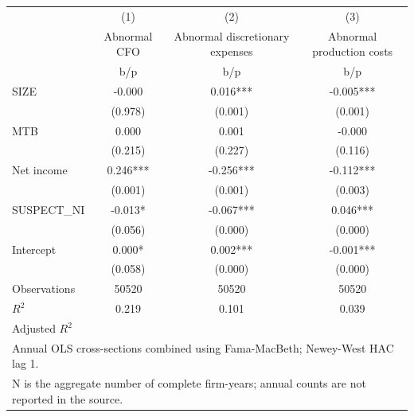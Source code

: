 {
\def\sym#1{\ifmmode^{#1}\else\(^{#1}\)\fi}
\begin{tabular}{l*{3}{c}}
\hline\hline
                    &\multicolumn{1}{c}{(1)}&\multicolumn{1}{c}{(2)}&\multicolumn{1}{c}{(3)}\\
                    &\multicolumn{1}{c}{Abnormal CFO}&\multicolumn{1}{c}{Abnormal discretionary expenses}&\multicolumn{1}{c}{Abnormal production costs}\\
                    &         b/p   &         b/p   &         b/p   \\
\hline
SIZE                &      -0.000   &       0.016***&      -0.005***\\
                    &     (0.978)   &     (0.001)   &     (0.001)   \\
MTB                 &       0.000   &       0.001   &      -0.000   \\
                    &     (0.215)   &     (0.227)   &     (0.116)   \\
Net income          &       0.246***&      -0.256***&      -0.112***\\
                    &     (0.001)   &     (0.001)   &     (0.003)   \\
SUSPECT\_NI          &      -0.013*  &      -0.067***&       0.046***\\
                    &     (0.056)   &     (0.000)   &     (0.000)   \\
Intercept           &       0.000*  &       0.002***&      -0.001***\\
                    &     (0.058)   &     (0.000)   &     (0.000)   \\
\hline
Observations        &       50520   &       50520   &       50520   \\
\(R^{2}\)           &       0.219   &       0.101   &       0.039   \\
Adjusted \(R^{2}\)  &               &               &               \\
\hline\hline
\multicolumn{4}{l}{\footnotesize Annual OLS cross-sections combined using Fama-MacBeth; Newey-West HAC lag 1.}\\
\multicolumn{4}{l}{\footnotesize N is the aggregate number of complete firm-years; annual counts are not reported in the source.}\\
\end{tabular}
}
